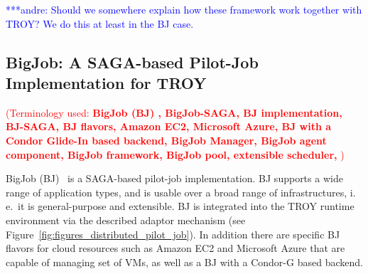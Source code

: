 \documentclass[conference,final]{IEEEtran}
\newcommand{\terminology}[1]{ {\textcolor{red} {(Terminology used: \textbf{#1}) }}}
\newcommand{\jhanote}[1]{ {\textcolor{red} { ***shantenu: #1 }}}
\newcommand{\alnote}[1]{ {\textcolor{blue} { ***andre: #1 }}}
\newcommand{\terminology}[1]{}
\newcommand{\alnote}[1]{}
\newcommand{\jhanote}[1]{}
\newcommand{\upp}{\vspace*{-0.5em}}
\begin{document}
\alnote{Should we somewhere explain how these framework work together with TROY? 
We do this at least in the BJ case.}

\subsection{BigJob: A SAGA-based Pilot-Job Implementation for
  TROY\upp\upp}
\label{sec:bigjob_description}
\terminology{BigJob (BJ) , BigJob-SAGA, BJ implementation,  BJ-SAGA, BJ flavors, Amazon EC2, Microsoft Azure,
 BJ with a Condor Glide-In based backend,  BigJob Manager, BigJob agent component, BigJob framework,
 BigJob pool, extensible scheduler, } 









BigJob (BJ)~\cite{bigjob_web,saga_bigjob_condor_cloud} is a SAGA-based pilot-job
implementation. BJ supports a wide range of application types, and is usable
over a broad range of infrastructures, i.\,e.\ it is general-purpose and
extensible. BJ is integrated into the TROY runtime environment via the described
adaptor mechanism (see Figure~\ref{fig:figures_distributed_pilot_job}). In
addition there are specific BJ flavors for cloud resources such as Amazon EC2
and Microsoft Azure that are capable of managing set of VMs, as well as a BJ
with a Condor-G based backend. 



\end{document}
